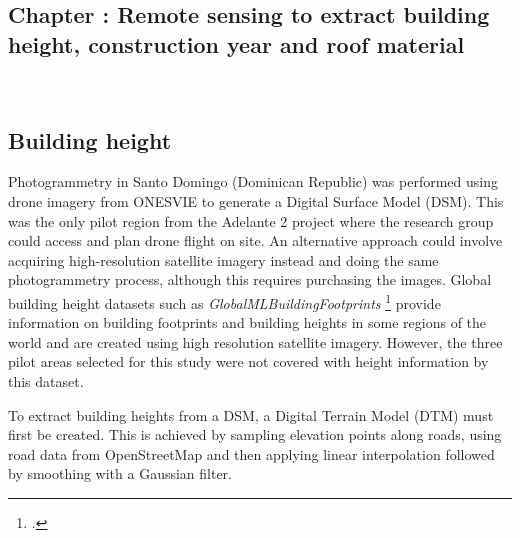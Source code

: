 \graphicspath{{figures_and_references/EELISA_conference/}}

\renewcommand{\chapternametext}{Chapter \thechapter: Remote sensing to extract building height, construction year and roof material}
\renewcommand{\shortchapternametext}{Chapter \thechapter: Remote sensing methodology}

\begin{refsection}

\chapter{\chapternametext}
\

\renewcommand{\headingtextL}{}
\renewcommand{\headingtextR}{\shortchapternametext}
\begingroup
 \flushbottom
 \setlength{\parskip}{0pt plus 1fil}%
 \localtableofcontents 
\endgroup

\begingroup
 \flushbottom
 \setlength{\parskip}{0pt plus 1fil}%
 \locallistoftables
\endgroup


\newpage

\setcounter{section}{0} 



\FloatBarrier

\renewcommand{\sectionnametext}{Building height}
\renewcommand{\headingtextL}{\shortchapternametext}
\renewcommand{\headingtextR}{\thesection. \sectionnametext}
\section{\sectionnametext}


Photogrammetry in Santo Domingo (Dominican Republic) was performed using drone imagery from ONESVIE to generate a Digital Surface Model (DSM). This was the only pilot region from the Adelante 2 project where the research group could access and plan drone flight on site. An alternative approach could involve acquiring high-resolution satellite imagery instead and doing the same photogrammetry process, although this requires purchasing the images. Global building height datasets such as \textit{GlobalMLBuildingFootprints} \footcite{microsoft_globalmlbuildingfootprints_2024} provide information on building footprints and building heights in some regions of the world and are created using high resolution satellite imagery. However, the three pilot areas selected for this study were not covered with height information by this dataset.


To extract building heights from a DSM, a Digital Terrain Model (DTM) must first be created. This is achieved by sampling elevation points along roads, using road data from OpenStreetMap and then applying linear interpolation followed by smoothing with a Gaussian filter.



\end{refsection}
